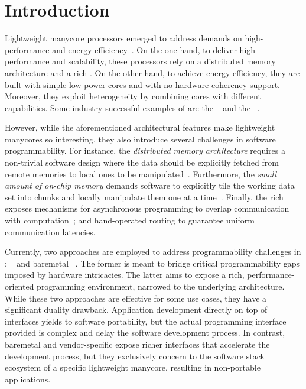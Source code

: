 \section{Introduction}
\label{sec:introduction}

	Lightweight manycore processors emerged to address demands on
	high-performance and energy efficiency~\cite{Francesquini2015}.
	On the one hand, to deliver high-performance and scalability, these
	processors rely on a distributed memory architecture and a rich
	\noc.  On the other hand, to achieve energy
	efficiency, they are built with simple low-power \mimd
	cores and \spms  with no hardware coherency
	support.  Moreover, they exploit heterogeneity
	by combining cores with different capabilities.
	Some industry-successful examples of \lws are the
	\mppa~\cite{DeDinechin2013-2} and the \epiphany~\cite{Olofsson2016}.

	However, while the aforementioned architectural features make lightweight
	manycores so interesting, they also introduce several challenges
	in software programmability.  For instance, the \textit{distributed
	memory architecture} requires a non-trivial software design where the
	data should be explicitly fetched from remote memories to local
	ones to be manipulated~\cite{Francesquini2015}.  Furthermore, the
	\textit{small amount of on-chip memory} demands software to
	explicitly tile the working data set into chunks and locally
	manipulate them one at a time~\cite{Souza2017}.
	Finally, the rich \noc exposes mechanisms for asynchronous programming
	to overlap communication with
	computation~\cite{Hascoet2017}; and hand-operated routing to
	guarantee uniform communication latencies.

	Currently, two approaches are employed to address programmability
	challenges in \lws: \oses~\cite{Kluge2014,
	Asmussen2016, Penna2019-3} and baremetal
	\runtimesys~\cite{Dinechin2013-1, Varghese2014, Richie2017}. The
	former is meant to bridge critical programmability gaps imposed by hardware
	intricacies.  The latter aims to expose a rich, performance-oriented
	programming environment, narrowed to the underlying architecture.
	While these two approaches are effective for some use cases, they
	have a significant duality drawback. Application development directly
	on top of \os interfaces yields to software portability, but the actual
	programming interface provided is
	complex and delay the software development process.  In contrast,
	baremetal and vendor-specific \runtimesys expose richer interfaces
	that accelerate the development process, but they exclusively concern to
	the software stack ecosystem of a specific lightweight manycore, resulting
	in non-portable applications.

